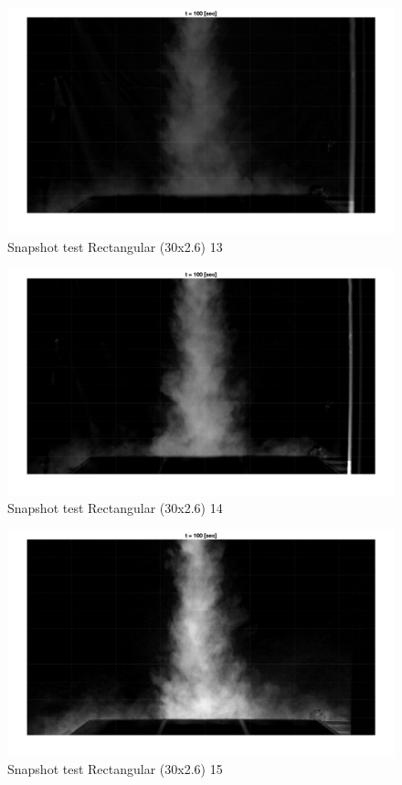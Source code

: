 \begin{figure}[ht!]
    \centering
    \includegraphics[width=\linewidth]{Images/Rec30_13_t100.jpg}
    \caption{Snapshot test Rectangular (30x2.6) 13}
\end{figure}

\begin{figure}[ht!]
    \centering
    \includegraphics[width=\linewidth]{Images/Rec30_14_t100.jpg}
    \caption{Snapshot test Rectangular (30x2.6) 14}
\end{figure}

\begin{figure}[ht!]
    \centering
    \includegraphics[width=\linewidth]{Images/Rec30_15_t100.jpg}
    \caption{Snapshot test Rectangular (30x2.6) 15}
\end{figure}

